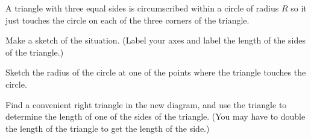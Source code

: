 \begin{problem}
\item A triangle with three equal sides is circumscribed within a
  circle of radius $R$ so it just touches the circle on each of the
  three corners of the triangle.

  \begin{subproblem}
  \item Make a sketch of the situation. (Label your axes and label the
    length of the sides of the triangle.)
  \item Sketch the radius of the circle at one of the points where the
    triangle touches the circle.
  \item Find a convenient right triangle in the new diagram, and use
    the triangle to determine the length of one of the sides of the
    triangle. (You may have to double the length of the triangle to
    get the length of the side.)
  \end{subproblem}


\end{problem}



